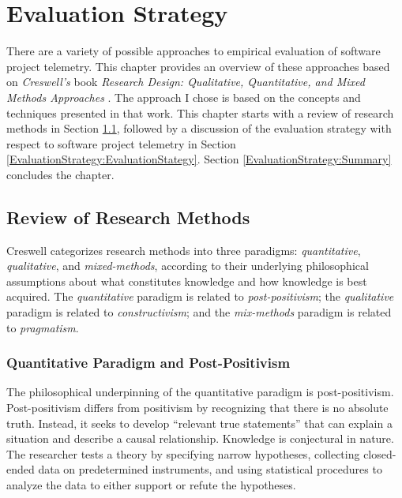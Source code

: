 \chapter{Evaluation Strategy}
\label{Chapter:EvaluationStrategy}


There are a variety of possible approaches to empirical evaluation of software project telemetry. This chapter provides an overview of these approaches based on \textit{Creswell's} book \textit{Research Design: Qualitative, Quantitative, and Mixed Methods Approaches} \cite{Creswell:2003}. The approach I chose is based on the concepts and techniques presented in that work.  
This chapter starts with a review of research methods in Section \ref{EvaluationStrategy:ResearchMethods}, followed by a discussion of the evaluation strategy with respect to software project telemetry in Section \ref{EvaluationStrategy:EvaluationStategy}.
Section \ref{EvaluationStrategy:Summary} concludes the chapter.




\section{Review of Research Methods} \label{EvaluationStrategy:ResearchMethods}

Creswell \cite{Creswell:2003} categorizes research methods into three paradigms: \textit{quantitative}, \textit{qualitative}, and \textit{mixed-methods}, according to their underlying philosophical assumptions about what constitutes knowledge and how knowledge is best acquired. The \textit{quantitative} paradigm is related to \textit{post-positivism}; the \textit{qualitative} paradigm is related to \textit{constructivism}; and the \textit{mix-methods} paradigm is related to \textit{pragmatism}.






\subsection{Quantitative Paradigm and Post-Positivism}

The philosophical underpinning of the quantitative paradigm is post-positivism. Post-positivism differs from positivism by recognizing that there is no absolute truth. Instead, it seeks to develop ``relevant true statements'' that can explain a situation and describe a causal relationship. Knowledge is conjectural in nature. The researcher tests a theory by specifying narrow hypotheses, collecting closed-ended data on predetermined instruments, and using statistical procedures to analyze the data to either support or refute the hypotheses. 

